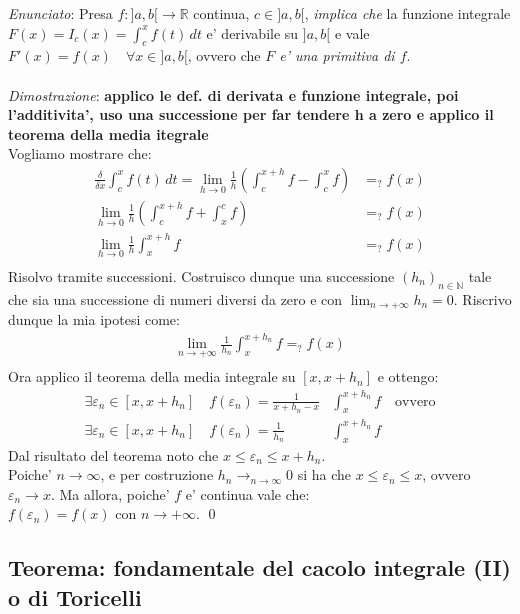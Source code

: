 \documentclass{article}
\begin{document}
\emph{Enunciato}: Presa $f: ]a, b[ \to \mathbb{R}$ continua, $c \in ]a,b[$,
\emph{implica che} la funzione integrale $F(x) = I_c(x) = \int_c^x f(t) \, dt$ e' derivabile su $]a,b[$ e vale
$F'(x) = f(x) \quad \forall x \in ]a,b[$, ovvero che \emph{$F$ e' una primitiva di $f$}. \\ \\
\emph{Dimostrazione}: \textbf{applico le def. di derivata e funzione integrale, poi l'additivita', uso una successione per far tendere h a zero e applico il teorema della media itegrale} \\
Vogliamo mostrare che:
\begin{align*}
  \frac{\delta }{\delta x} \int_c^x f(t) \, dt = \lim_{h \to 0} \frac{1}{h}(\int_c^{x+h}f - \int_c^{x}f) &=_? f(x) \\
  \lim_{h \to 0} \frac{1}{h}(\int_c^{x+h}f + \int_x^{c}f) &=_? f(x) \\
  \lim_{h \to 0} \frac{1}{h}\int_x^{x+h}f &=_? f(x) \\
\end{align*}
Risolvo tramite successioni. Costruisco dunque una successione $(h_n)_{n \in \mathbb{N}}$
tale che sia una successione di numeri diversi da zero e con $\lim_{n \to +\infty} h_n = 0$.
Riscrivo dunque la mia ipotesi come:
\begin{align*}
  \lim_{n \to +\infty} \frac{1}{h_n}\int_x^{x+h_n}f =_? f(x) \\
\end{align*}
Ora applico il teorema della media integrale su $[x, x+h_n]$ e ottengo:
\begin{align*}
  \exists \varepsilon_n \in [x, x+h_n] \quad f(\varepsilon_n) =  \frac{1}{x+h_n - x} &\int_x^{x+h_n}
  f \quad \text{ovvero} \\
  \exists \varepsilon_n \in [x, x+h_n] \quad f(\varepsilon_n) =\frac{1}{h_n} &\int_x^{x+h_n} f
\end{align*}
Dal risultato del teorema noto che $x \leq \varepsilon_n \leq x + h_n$. \\
Poiche' $n \to \infty$, e per costruzione $h_n \to_{n \to \infty} 0$ si ha che
$ x \leq \varepsilon_n \leq x$, ovvero $\varepsilon_n \to x$. Ma allora, poiche' $f$ e' continua vale che: \\
$f(\varepsilon_n) = f(x)$  con $n \to +\infty$. \qed

\subsection{Teorema: fondamentale del cacolo integrale (II) o di Toricelli}
\end{document}
